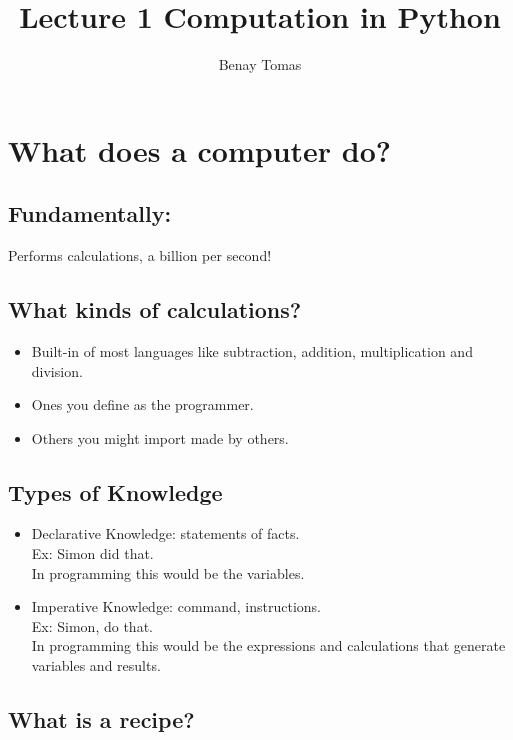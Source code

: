 \documentclass{article}
\title{Lecture 1 Computation in Python}
\author{Benay Tomas}
\begin{document}
\maketitle

{
    
\Large

\section*{What does a computer do?}
\subsection*{Fundamentally:}
Performs calculations, a billion per second!

\subsection*{What kinds of calculations?}

\begin{itemize}
    \item Built-in of most languages like subtraction, addition, 
    multiplication and division.
    \item Ones you define as the programmer.
    \item Others you might import made by others.
\end{itemize}

\subsection*{Types of Knowledge}

\begin{itemize}
    \item Declarative Knowledge: statements of facts.\\
    Ex: Simon did that.\\
    In programming this would be the variables.
    \item Imperative Knowledge: command, instructions.\\
    Ex: Simon, do that.\\
    In programming this would be the expressions and 
    calculations that generate variables and results.
\end{itemize}

\subsection*{What is a recipe?}

}
\end{document}
